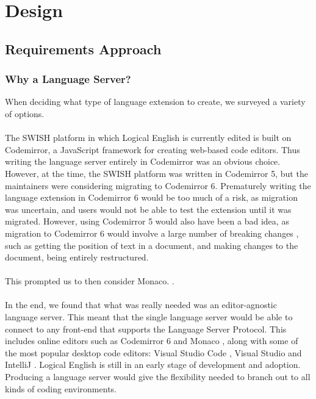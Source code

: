 \documentclass[../main.tex]{subfiles}
\begin{document}
\chapter{Design}
\section{Requirements Approach}
\subsection{Why a Language Server?}
When deciding what type of language extension to create, we surveyed a variety of options. 
\\
\\
The SWISH platform in which Logical English is currently edited is built on Codemirror, a JavaScript framework for creating web-based code editors. Thus writing the language server entirely in Codemirror was an obvious choice. However, at the time, the SWISH platform was written in Codemirror 5, but the maintainers were considering migrating to Codemirror 6. Prematurely writing the language extension in Codemirror 6 would be too much of a risk, as migration was uncertain, and users would not be able to test the extension until it was migrated. However, using Codemirror 5 would also have been a bad idea, as migration to Codemirror 6 would involve a large number of breaking changes \cite{codemirror_migration}, such as getting the position of text in a document, and making changes to the document, being entirely restructured.
\\ 
\\ 
This prompted us to then consider Monaco. .
\\ 
\\ 
In the end, we found that what was really needed was an editor-agnostic language server. This meant that the single language server would be able to connect to any front-end that supports the Language Server Protocol. This includes online editors such as Codemirror 6 \cite{codemirror_6_language_server} and Monaco \cite{monaco_language_server}, along with some of the most popular desktop code editors: Visual Studio Code \cite{vsc_langserver_docs}, Visual Studio \cite{visual_studio_language_server} and IntelliJ \cite{intellij_language_server} \cite{ide_rankings}. Logical English is still in an early stage of development and adoption. Producing a language server would give the flexibility needed to branch out to all kinds of coding environments.
\end{document}
